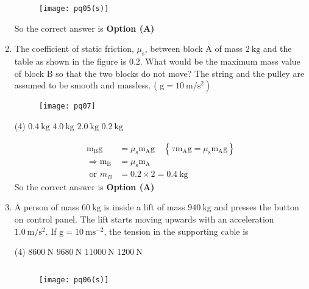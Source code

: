 \begin{enumerate}[label=\color{ocre}\textbf{\arabic*.}]
\begin{answer}
\begin{figure}[H]
			\centering
			\texttt{[image: pq05(s)]}
		\end{figure}
		So the correct answer is \textbf{Option (A)}
	\end{answer}
	\item The coefficient of static friction, $\mu_{\mathrm{s}}$, between block $\mathrm{A}$ of mass $2 \mathrm{~kg}$ and the table as shown in the figure is $0.2$. What would be the maximum mass value of block $\mathrm{B}$ so that the two blocks do not move? The string and the pulley are assumed to be smooth and massless. ( $\left.\mathrm{g}=10 \mathrm{~m} / \mathrm{s}^{2}\right)$
	\begin{figure}[H]
		\centering
		\texttt{[image: pq07]}
	\end{figure}
	\begin{tasks}(4)
		\task[\textbf{A.}]$0.4 \mathrm{~kg}$
		\task[\textbf{B.}] $4.0 \mathrm{~kg}$
		\task[\textbf{C.}] $2.0 \mathrm{~kg}$
		\task[\textbf{D.}] $0.2 \mathrm{~kg}$
	\end{tasks}
	\begin{answer}
		\begin{align*}
		\mathrm{m}_{\mathrm{B}} \mathrm{g}&=\mu_{\mathrm{s}} \mathrm{m}_{\mathrm{A}} \mathrm{g} \quad\left\{\because \mathrm{m}_{\mathrm{A}} \mathrm{g}=\mu_{\mathrm{s}} \mathrm{m}_{\mathrm{A}} \mathrm{g}\right\}\\
		\Rightarrow \mathrm{m}_{\mathrm{B}}&=\mu_{\mathrm{s}} \mathrm{m}_{\mathrm{A}}\\
		\text{	or }m_{B}&=0.2 \times 2=0.4 \mathrm{~kg}
		\end{align*}
		So the correct answer is \textbf{Option (A)}
	\end{answer}
	\item A person of mass $60 \mathrm{~kg}$ is inside a lift of mass $940 \mathrm{~kg}$ and presses the button on control panel. The lift starts moving upwards with an acceleration $1.0 \mathrm{~m} / \mathrm{s}^{2}$. If $\mathrm{g}=10 \mathrm{~ms}^{-2}$, the tension in the supporting cable is
	\begin{tasks}(4)
		\task[\textbf{A.}]$8600 \mathrm{~N}$
		\task[\textbf{B.}] $9680 \mathrm{~N}$
		\task[\textbf{C.}] $11000 \mathrm{~N}$
		\task[\textbf{D.}]  $1200 \mathrm{~N}$
	\end{tasks}
	\begin{answer}$\left. \right. $
		\begin{figure}[H]
			\centering
			\texttt{[image: pq06(s)]}
		\end{figure}

\end{answer}
\end{enumerate}
